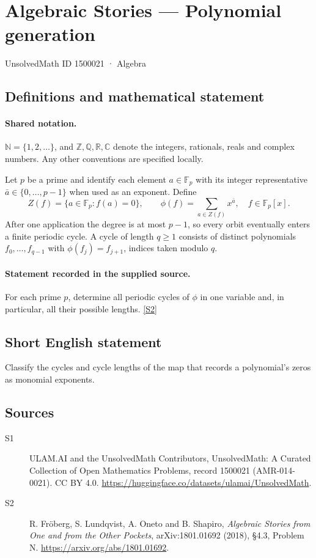 \documentclass[11pt]{article}
\newcommand{\sref}[2]{\hyperlink{source:#1:#2}{[S#2]}}
\begin{document}
\setcounter{section}{1500020}
\section{Algebraic Stories — Polynomial generation}\label{1500021}
{\small\sffamily UnsolvedMath ID 1500021 · Algebra}
\subsection{Definitions and mathematical statement}

\paragraph{Shared notation.}$\mathbb N=\{1,2,\ldots\}$, and $\mathbb Z,\mathbb Q,\mathbb R,\mathbb C$ denote the integers, rationals, reals and complex numbers. Any other conventions are specified locally.


Let $p$ be a prime and identify each element $a\in\mathbb F_p$ with its integer representative $\bar a\in\{0,\ldots,p-1\}$ when used as an exponent. Define
\[Z(f)=\{a\in\mathbb F_p:f(a)=0\},\qquad\phi(f)=\sum_{a\in Z(f)}x^{\bar a},\quad f\in\mathbb F_p[x].
\]
After one application the degree is at most $p-1$, so every orbit eventually enters a finite periodic cycle. A cycle of length $q\geq1$ consists of distinct polynomials $f_0,\ldots,f_{q-1}$ with $\phi(f_j)=f_{j+1}$, indices taken modulo $q$.
\paragraph{Statement recorded in the supplied source.}
For each prime $p$, determine all periodic cycles of $\phi$ in one variable and, in particular, all their possible lengths. \sref{1500021}{2}
\subsection{Short English statement}
Classify the cycles and cycle lengths of the map that records a polynomial’s zeros as monomial exponents.
\subsection{Sources}
\begin{description}
\item[\hypertarget{source:1500021:1}{S1}] ULAM.AI and the UnsolvedMath Contributors, UnsolvedMath: A Curated Collection of Open Mathematics Problems, record 1500021 (AMR-014-0021). CC BY 4.0. \url{https://huggingface.co/datasets/ulamai/UnsolvedMath}.
\item[\hypertarget{source:1500021:2}{S2}] R. Fröberg, S. Lundqvist, A. Oneto and B. Shapiro, \emph{Algebraic Stories from One and from the Other Pockets}, arXiv:1801.01692 (2018), §4.3, Problem N. \url{https://arxiv.org/abs/1801.01692}.
\end{description}
\label{end:1500021}
\end{document}
